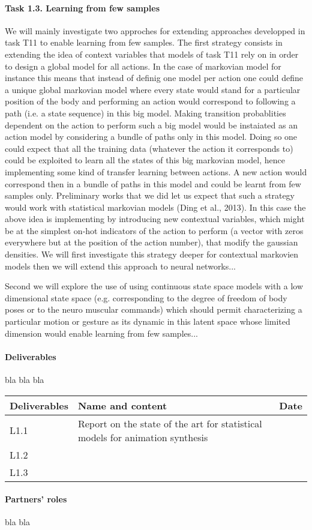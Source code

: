 \paragraph{Task 1.3. Learning from few samples}

We will mainly investigate two approches for extending approaches developped in task T11 to enable learning from few samples. The first strategy consists in extending the idea of context variables that models of task T11 rely on in order to design a global model for all actions.
In the case of markovian model for instance this means that instead of definig one model per action one could define a unique global markovian model where every state would stand for a particular position of the body and performing an action would correspond to following a path (i.e. a state sequence) in this big model. 
Making transition probablities dependent on the action to perform such a big model would be instaiated as an action model by considering a bundle of paths only in this model.  Doing so one could expect that all the training data (whatever the action it corresponds to) could be exploited to learn all the states of this big markovian model, hence implementing some kind of transfer learning between actions. 
A new action would correspond then in a bundle of paths in this model and could be learnt from few samples only. Preliminary works that we did let us expect that such a strategy would work with statistical markovian models (Ding et al., 2013). In this case the above idea is implementing by introducing new contextual variables, which might be at the simplest on-hot indicators 
of the action to perform (a vector with zeros everywhere but at the position of the action number), 
that modify the gaussian densities. We will first investigate this strategy deeper for contextual markovien models then we will extend this approach to neural networks...

Second we will explore the use of using continuous state space models with a low dimensional state space (e.g. corresponding to the degree of freedom of body poses or to the neuro muscular commands) which should permit characterizing a particular motion or gesture as its dynamic in this latent space whose limited dimension would enable learning from few samples...

\paragraph{Deliverables}

bla bla bla

\begin{tabular}{|l|l|l|}\hline
Deliverables & Name and content  & Date  \\\hline
L1.1  & Report on the state of the art for statistical models for animation synthesis & \\\hline
L1.2  &  & \\\hline
L1.3  &  & \\\hline
\end{tabular}

\paragraph{Partners' roles}

bla bla

\endinput